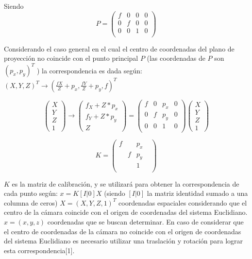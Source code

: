 Siendo
\[
P = 
\begin{pmatrix}
f & 0 & 0 & 0 \\
0 & f & 0 & 0 \\
0 & 0 & 1 & 0 \\
\end{pmatrix}
\]

Considerando el caso general en el cual el centro de coordenadas del plano de proyección no coincide con el punto principal $P$ (las coordenadas de $P$ son $(p_x,p_y)^T$ ) la correspondencia es dada según:
$(X,Y,Z)^T \to (\frac{fX}{Z} + p_x, \frac{fY}{Z} + p_y, f)^T$

\[
\begin{pmatrix}
X \\ Y \\ Z \\ 1
\end{pmatrix}
\to
\begin{pmatrix}
f_X + Z * p_x \\ f_Y + Z * p_y \\ Z
\end{pmatrix}
=
\begin{pmatrix}
f & 0 & p_x & 0 \\
0 & f & p_y & 0 \\
0 & 0 & 1 & 0 \\
\end{pmatrix}
\begin{pmatrix}
X \\ Y \\ Z \\ 1
\end{pmatrix}
\]

\[
K =
\begin{pmatrix}
f &   & p_x & \\
  & f & p_y & \\
  &   & 1   & \\
\end{pmatrix}
\]

$K$ es la matriz de calibración, y se utilizará para obtener la correspondencia de cada punto según:
$x = K [I|0] X$
(siendo $[I|0]$ la matriz identidad sumado a una columna de ceros)
$X = (X,Y,Z,1)^T$ coordenadas espaciales considerando que el centro de la cámara coincide con el origen de coordenadas del sistema Euclidiano.
$x = (x, y, z)$ coordenadas que se buscan determinar.
En caso de considerar que el centro de coordenadas de la cámara no coincide con el origen de coordenadas del sistema Euclidiano es necesario utilizar una traslación y rotación para lograr esta correspondencia[1].%

